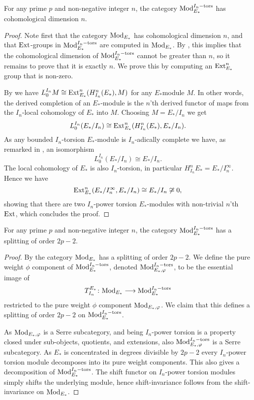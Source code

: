 \begin{lemma}
    \label{ch1:lm:cohomological-dimension-torsion-modules}
    For any prime $p$ and non-negative integer $n$, the category $\mathrm{Mod}_{E_*}^{I_n-\mathrm{tors}}$ has cohomological dimension $n$. 
\end{lemma}
\begin{proof}
    Note first that the category $\mathrm{Mod}_{E_*}$ has cohomological dimension $n$, and that $\operatorname{Ext}$-groups in $\mathrm{Mod}_{E_*}^{I_n-\mathrm{tors}}$ are computed in $\mathrm{Mod}_{E_*}$. By \cite[2.1.4]{brodmann-sharp_1998}, this implies that the cohomological dimension of $\mathrm{Mod}_{E_*}^{I_n-\mathrm{tors}}$ cannot be greater than $n$, so it remains to prove that it is exactly $n$. We prove this by computing an $\operatorname{Ext}^n_{E_*}$ group that is non-zero.
    
    By \cite[A.2(d)]{hovey-strickland_99} we have $L^{I_n}_0 M \cong \operatorname{Ext}_{E_*}^n(H_{I_n}^n(E_*), M)$ for any $E_*$module $M$. In other words, the derived completion of an $E_*$-module is the $n$'th derived functor of maps from the $I_n$-local cohomology of $E_*$ into $M$. Choosing $M=E_*/I_n$ we get 
    \[L^{I_n}_0 (E_*/I_n)\cong \operatorname{Ext}_{E_*}^n(H^n_{I_n}(E_*), E_*/I_n).\]
    As any bounded $I_n$-torsion $E_*$-module is $I_n$-adically complete we have, as remarked in \cite[1.4]{barthel-heard_16}, an isomorphism 
    \[L^{I_n}_0 (E_*/I_n)\cong E_*/I_n.\] 
    The local cohomology of $E_*$ is also $I_n$-torsion, in particular $H_{I_n}^n E_* = E_*/I_n^\infty$. Hence we have 
    \[\operatorname{Ext}_{E_*}^n(E_*/I_n^\infty, E_*/I_n)\cong E_*/I_n \not \cong 0,\]
    showing that there are two $I_n$-power torsion $E_*$-modules with non-trivial $n$'th $\operatorname{Ext}$, which concludes the proof.
\end{proof}

\begin{lemma}
    \label{ch1:lm:splitting-torsion-modules}
    For any prime $p$ and non-negative integer $n$, the category $\mathrm{Mod}_{E_*}^{I_n-\mathrm{tors}}$ has a splitting of order $2p-2$. 
\end{lemma}
\begin{proof}
    By \cite[8.1]{patchkoria-pstragowski_2021} the category $\mathrm{Mod}_{E_*}$ has a splitting of order $2p-2$. We define the pure weight $\phi$ component of $\mathrm{Mod}_{E_*}^{I_n-\mathrm{tors}}$, denoted $\mathrm{Mod}_{E_*, \varphi}^{I_n-\mathrm{tors}}$, to be the essential image of 
    \[T_{I_n}^{E_*}\colon \mathrm{Mod}_{E_*}\longrightarrow \mathrm{Mod}_{E_*}^{I_n-\mathrm{tors}}\]
    restricted to the pure weight $\phi$ component $\mathrm{Mod}_{E_*, \varphi}$. We claim that this defines a splitting of order $2p-2$ on $\mathrm{Mod}_{E_*}^{I_n-\mathrm{tors}}$. 

    As $\mathrm{Mod}_{E_*, \varphi}$ is a Serre subcategory, and being $I_n$-power torsion is a property closed under sub-objects, quotients, and extensions, also $\mathrm{Mod}_{E_*, \varphi}^{I_n-\mathrm{tors}}$ is a Serre subcategory. As $E_*$ is concentrated in degrees divisible by $2p-2$ every $I_n$-power torsion module decomposes into its pure weight components. This also gives a decomposition of $\mathrm{Mod}_{E_*}^{I_n-\mathrm{tors}}$. The shift functor on $I_n$-power torsion modules simply shifts the underlying module, hence shift-invariance follows from the shift-invariance on $\mathrm{Mod}_{E_*}$. 
\end{proof}

